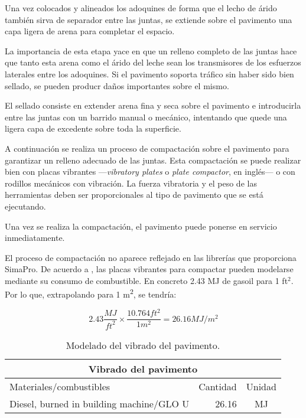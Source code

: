 Una vez colocados y alineados los adoquines de forma que el lecho de árido también sirva de separador entre las juntas, se extiende sobre el pavimento una capa ligera de arena para completar el espacio.

La importancia de esta etapa yace en que un relleno completo de las juntas hace que tanto esta arena como el árido del leche sean los transmisores de los esfuerzos laterales entre los adoquines. Si el pavimento soporta tráfico sin haber sido bien sellado, se pueden producr daños importantes sobre el mismo.

El sellado consiste en extender arena fina y seca sobre el pavimento e introducirla entre las juntas con un barrido manual o mecánico, intentando que quede una ligera capa de excedente sobre toda la superficie.

A continuación se realiza un proceso de compactación sobre el pavimento para garantizar un relleno adecuado de las juntas. Esta compactación se puede realizar bien con placas vibrantes —\textit{vibratory plates} o \textit{plate compactor}, en inglés— o con rodillos mecánicos con vibración. La fuerza vibratoria y el peso de las herramientas deben ser proporcionales al tipo de pavimento que se está ejecutando.

Una vez se realiza la compactación, el pavimento puede ponerse en servicio inmediatamente.

El proceso de compactación no aparece reflejado en las librerías que proporciona SimaPro. De acuerdo a \cite{rieradevall}, las placas vibrantes para compactar pueden modelarse mediante su consumo de combustible. En concreto 2.43 \si{MJ} de gasoil para 1 ft$^2$. Por lo que, extrapolando para 1 \si{m^2}, se tendría:

\begin{equation}
2.43\frac{MJ}{{ft}^2} \times \frac{10.764{ft^2}}{1m^2}=26.16MJ/m^2
\end{equation}

\begin{table}[!htb]
\centering
\begin{tabular}{p{8cm}rc}
\toprule
\multicolumn{3}{c}{Vibrado del pavimento}\\
\midrule
Materiales/combustibles & Cantidad & Unidad\\
\midrule
Diesel, burned in building machine/GLO U & 26.16 & \si{MJ}\\
\bottomrule
\end{tabular}
\caption{Modelado del vibrado del pavimento.}
\label{modeladovibrado}
\end{table}

